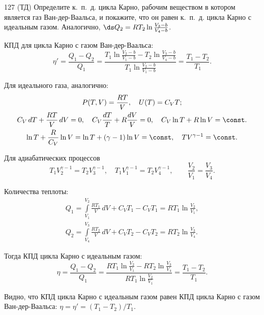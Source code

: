 \documentclass[pscyr]{hedwork}
\begin{document}
\begin{task}{127 (ТД)}{
    Определите к.~п.~д. цикла Карно, рабочим веществом в котором является газ
    Ван-дер-Ваальса, и покажите, что он равен к.~п.~д. цикла Карно с идеальным
    газом.
  }
    Аналогично, \( \ds Q_2 = RT_2\ln\frac{V_3 - b}{V_4 - b} \).
    
    КПД для цикла Карно с газом Ван-дер-Ваальса:
    \[
      \eta' = \frac{Q_1 - Q_2}{Q_1} = \frac{T_1\ln\frac{V_2 - b}{V_1 - b} -
        T_2\ln\frac{V_3 - b}{V_4 - b}}{T_1\ln\frac{V_2 - b}{V_1 - b}} =
        \frac{T_1 - T_2}{T_1}.
    \]
  
    Для идеального газа, аналогично:
    \begin{gather*}
      P(T, V) = \frac{RT}{V}, \quad U(T) = C_VT; \\
      C_V\,dT + \frac{RT}{V}\,dV = 0, \quad
        C_V\frac{dT}{T} + R\frac{dV}{V} = 0, \quad
        C_V\ln T + R\ln V = \const. \\
      \ln T + \frac{R}{C_V}\ln V = \ln T + (\gamma - 1)\ln V = \const, \quad
      TV^{\gamma - 1} = \const.
    \end{gather*}
    
    Для адиабатических процессов
    \[
      T_1V_2^{\gamma - 1} = T_2V_3^{\gamma - 1}, \quad
        T_1V_1^{\gamma - 1} = T_2V_4^{\gamma - 1}, \qquad
      \frac{V_2}{V_1} = \frac{V_3}{V_4}.
    \]
    
    Количества теплоты:
    \begin{gather*}
      Q_1 = \int\limits_{V_1}^{V_2} \frac{RT_1}{V}\,dV + C_VT_1 - C_VT_1 =
        RT_1\ln\frac{V_2}{V_1}, \\
      Q_2 = \int\limits_{V_4}^{V_3} \frac{RT_2}{V}\,dV + C_VT_2 - C_VT_2 =
        RT_2\ln\frac{V_3}{V_4}.
    \end{gather*}
    
    Тогда КПД цикла Карно с идеальным газом:
    \[
      \eta = \frac{Q_1 - Q_2}{Q_1} = \frac{RT_1\ln\frac{V_2}{V_1} -
        RT_2\ln\frac{V_3}{V_4}}{RT_1\ln\frac{V_2}{V_1}} =
        \frac{T_1 - T_2}{T_1}.
    \]
    
    Видно, что КПД цикла Карно с идеальным газом равен КПД цикла Карно с газом
    Ван-дер-Ваальса: \( \eta = \eta' = (T_1 - T_2) / T_1 \).
  
  \end{task}
  
\end{document}
